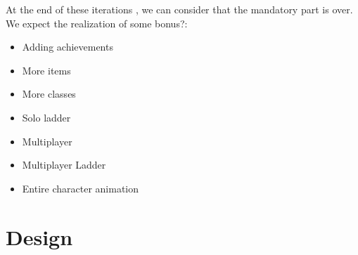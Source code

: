 \documentclass[16pt, oneside]{report}
\begin{document}
At the end of these iterations , we can consider that the mandatory part is over. We expect the realization of some bonus?:\\
\begin{itemize}
	\item	Adding achievements
	\item	More items
	\item	More classes
	\item	Solo ladder
	\item Multiplayer
	\item	 Multiplayer Ladder
	\item	Entire character animation
\end{itemize}

\chapter{Design}
\end{document}
